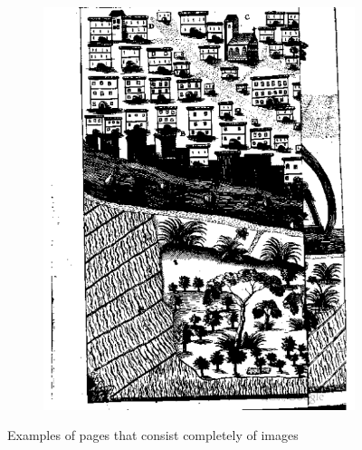 \begin{figure}
\begin{subfigure}[b]{0.4\textwidth}
\includegraphics[width=\textwidth]{resources/500_0077}
    \end{subfigure}
    \caption{Examples of pages that consist completely of images}
    \label{fig:imageExamples}
\end{figure}


